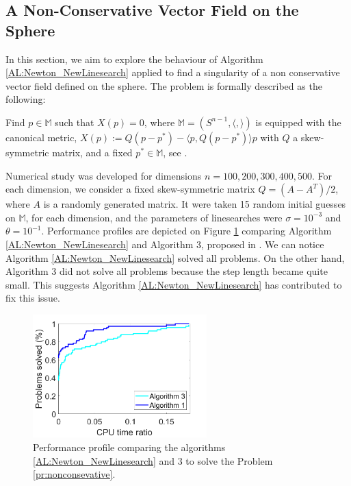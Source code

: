 \subsection{A Non-Conservative Vector Field on the Sphere}
In this section, we aim to explore the behaviour of Algorithm \ref{AL:Newton_NewLinesearch} applied to find a singularity of a non conservative vector field defined on the sphere. The problem is formally described as the following:

\begin{problem}\label{pr:nonconsevative}
    Find $p \in \mathbb{M}$ such that
    $X(p) = 0$,    where $\mathbb{M}=(S^{n-1},\langle,\rangle)$ is equipped with the canonical metric, $X(p):=Q(p-p^*)-\langle p,Q(p-p^*) \rangle p$ with $Q$ a skew-symmetric matrix, and  a fixed $p^* \in \mathbb{M}$, see \cite{MR4102428}.
\end{problem}

\noindent Numerical study was developed for dimensions $n=100,200,300,400,500$.
 For each dimension, we consider a fixed skew-symmetric matrix $Q=(A-A^T)/2$, where $A$ is a randomly generated matrix.
 It were taken 15 random initial guesses on $\mathbb{M}$, for each dimension, and the parameters of linesearches were $\sigma = 10^{-3}$ and $\theta = 10^{-1}$.
  Performance profiles are depicted on Figure \ref{fig:ncarmxnls} comparing Algorithm \ref{AL:Newton_NewLinesearch} and Algorithm 3, proposed in \cite{bortoloti2022efficient}.
  We can notice Algorithm \ref{AL:Newton_NewLinesearch} solved all problems.
  On the other hand, Algorithm 3 did not solve all problems because the step length became quite small.
  This suggests Algorithm \ref{AL:Newton_NewLinesearch} has contributed to fix this issue.
\begin{figure}
	\centering
	\includegraphics[width=0.6\textwidth]{nonconservative.png}
	\caption{Performance profile comparing the algorithms \ref{AL:Newton_NewLinesearch} and  3  to solve the Problem \ref{pr:nonconsevative}.}
	\label{fig:ncarmxnls}
\end{figure}

